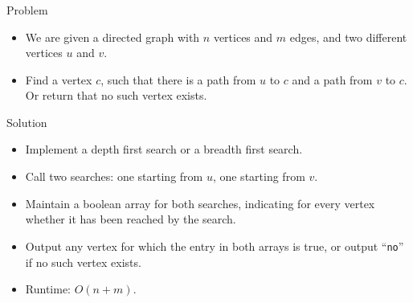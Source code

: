 \begin{frame}
    \frametitle{\problemtitle}
    \begin{block}{Problem}
        \begin{itemize}
            \item We are given a directed graph with $n$ vertices and $m$ edges, and two different vertices $u$ and $v$.
            \item Find a vertex $c$, such that there is a path from $u$ to $c$ and a path from $v$ to $c$. Or return that no such vertex exists.
        \end{itemize}
    \end{block}
    \pause
    \begin{block}{Solution}
        \begin{itemize}
            \item Implement a depth first search or a breadth first search.
            \item Call two searches: one starting from $u$, one starting from $v$.
            \pause
            \item Maintain a boolean array for both searches, indicating for every vertex whether it has been reached by the search.
            \item Output any vertex for which the entry in both arrays is true, or output ``\texttt{no}'' if no such vertex exists.
            \item Runtime: $O(n+m)$.
        \end{itemize}
    \end{block}
\end{frame}

